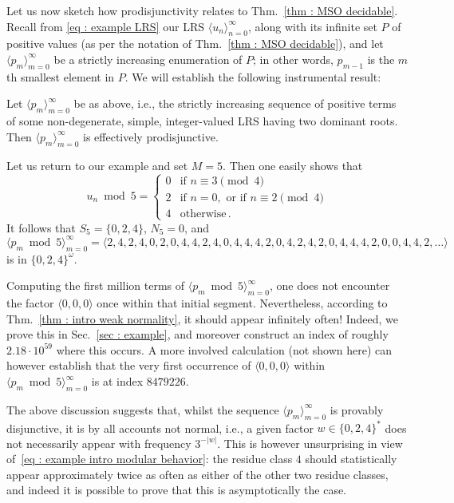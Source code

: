 \documentclass[a4paper,UKenglish,cleveref, autoref, thm-restate]{lipics-v2021}
\begin{document}
Let us now sketch how prodisjunctivity relates to Thm.~\ref{thm : MSO decidable}. 
Recall from \eqref{eq : example LRS} our LRS $\langle u_n\rangle_{n=0}^\infty$, along with its infinite set $P$ of positive values (as per the notation of Thm.~\ref{thm : MSO decidable}),
and let $\langle p_m\rangle_{m=0}^\infty$ be a strictly increasing
enumeration of $P$; in other words, $p_{m-1}$ is the $m$th smallest element in $P$.
We will establish the following instrumental result:

\begin{theorem}\label{thm : intro weak normality}
  Let $\langle p_m\rangle_{m=0}^\infty$ be as above, i.e., the
  strictly increasing sequence of positive terms of some non-degenerate, simple,
integer-valued LRS having two dominant roots. Then
$\langle p_m\rangle_{m=0}^\infty$ is effectively prodisjunctive.
\end{theorem}

Let us return to our example and set $M = 5$. 
Then one easily shows that
\begin{equation}\label{eq : example intro modular behavior}
    u_n\bmod 5 = \begin{cases}
        0 & \text{if } n\equiv 3 \pmod 4 \\
        2 & \text{if } n = 0, \text{ or if } n \equiv 2 \pmod 4  \\
        4 & \text{otherwise} \, .
    \end{cases}
\end{equation}
It follows that $S_5 = \{0,2,4\}$, $N_5 = 0$, and
\begin{equation*}
  \langle p_m\bmod 5\rangle_{m=0}^\infty =
    \langle 2, 4, 2, 4, 0, 2, 0, 4, 4, 2, 4, 0, 4, 4, 4,2,
    0, 4, 2, 4, 2, 0, 4, 4, 4, 2, 0, 0, 4, 4, 2, \dots\rangle
\end{equation*}
is in $\{0,2,4\}^\omega$.

Computing the first million terms of $\langle p_m\bmod 5\rangle_{m=0}^\infty$, one does not encounter the factor $\langle 0,0,0 \rangle$ once within that initial segment. 
Nevertheless, according to Thm.~\ref{thm : intro weak normality}, it should appear infinitely often! 
Indeed, we prove this in Sec.~\ref{sec : example}, and moreover
construct an index of roughly $2.18 \cdot 10^{59}$ where this
occurs. A more involved calculation (not shown here) can however establish that the very first
occurrence of $\langle 0,0,0 \rangle$ within $\langle p_m \bmod
5\rangle_{m=0}^\infty$ is at index $8479226$.

The above discussion suggests that, whilst the sequence
$\langle p_m\rangle_{m=0}^\infty$ is provably disjunctive, it is
by all accounts not normal, i.e., a given factor $w \in \{0,2,4\}^*$ does
not necessarily appear with frequency $3^{-|w|}$.  This is however
unsurprising in view of~\eqref{eq : example intro modular behavior}:
the residue class $4$ should statistically appear approximately twice
as often as either of the other two residue classes, and indeed it is
possible to prove that this is asymptotically the case.
\end{document}

